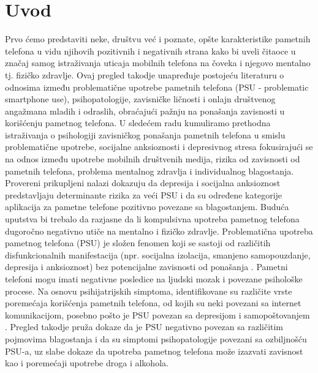 \documentclass[a4paper]{article}
\begin{document}
\section{Uvod}
Prvo ćemo predstaviti neke, društvu već i poznate, opšte 
karakteristike pametnih telefona u vidu njihovih pozitivnih i negativnih strana
kako bi uveli čitaoce u značaj samog istraživanja uticaja mobilnih telefona
na čoveka i njegovo mentalno tj. fizičko zdravlje.
\newline
Ovaj pregled takodje unapređuje postojeću literaturu o odnosima između
problematične upotrebe pametnih telefona (PSU - problematic smartphone use), 
psihopatologije, zavisničke ličnosti i onlajn društvenog angažmana mladih i odraslih, 
obraćajući pažnju na ponašanja zavisnosti u korišćenju pametnog telefona.
\newline
\newline
U sledećem radu kumuliramo prethodna istraživanja o psihologiji zavisničkog
ponašanja pametnih telefona u smislu problematične upotrebe,
socijalne anksioznosti i depresivnog stresa fokusirajući se na odnos između
upotrebe mobilnih društvenih medija, rizika od zavisnosti od pametnih telefona,
problema mentalnog zdravlja i individualnog blagostanja.
Provereni prikupljeni nalazi dokazuju da depresija i socijalna anksioznost
predstavljaju determinante rizika za veći PSU i da su određene kategorije
aplikacija za pametne telefone pozitivno povezane sa blagostanjem.
\newline
\newline
Buduća uputstva bi trebalo da razjasne da li
kompulsivna upotreba pametnog telefona dugoročno negativno utiče na mentalno
i fizičko zdravlje.
\newline
\newline
Problematična upotreba pametnog telefona (PSU) je složen
fenomen koji se sastoji od različitih disfunkcionalnih
manifestacija (npr. socijalna izolacija, smanjeno samopouzdanje,
depresija i anksioznost) bez potencijalne zavisnosti od ponašanja \cite{phone}.
Pametni telefoni mogu imati negativne posledice na ljudski mozak i povezane
psihološke procese.
Na osnovu psihijatrijskih simptoma, identifikovane su različite
vrste poremećaja korišćenja pametnih telefona, od kojih su neki povezani
sa internet komunikacijom, posebno pošto je PSU povezan sa depresijom
i samopoštovanjem \cite{miss}.
\newline
Pregled takodje pruža dokaze da je PSU negativno povezan sa različitim
pojmovima blagostanja i da su simptomi psihopatologije povezani sa
ozbiljnošću PSU-a, uz slabe dokaze da upotreba pametnog
telefona može izazvati zavisnost kao i poremećaji upotrebe droga i alkohola.
\end{document}
